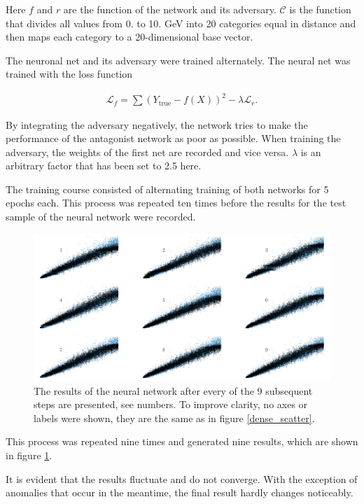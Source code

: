 \documentclass[12pt, a4paper]{thesis}
\begin{document}
Here \(f\) and \(r\) are the function of the network and its
adversary. \(\mathcal{C}\) is the function that divides all values
from 0. to 10. GeV into 20 categories equal in distance and then maps
each category to a 20-dimensional base vector.

The neuronal net and its adversary were trained alternately. The
neural net was trained with the loss function

\begin{align}
\mathcal{L}_f = \sum (Y_{\text{true}} - f(X))^2 - \lambda
\mathcal{L}_r.
\end{align}

By integrating the adversary negatively, the network tries to make the
performance of the antagonist network as poor as possible. When
training the adversary, the weights of the first net are recorded and
vice versa. \(\lambda\) is an arbitrary factor that has been set to 2.5
here. 

The training course consisted of alternating training of both networks
for 5 epochs each. This process was repeated ten times before the
results for the test sample of the neural network were recorded.

\begin{figure}[H]
\centering
\includegraphics[width=.9\linewidth]{../images/adv_scatter.png}
\caption{ The results of the neural network after every of the 9
  subsequent steps are presented, see numbers. To improve clarity, no
  axes or labels were shown, they are the same as in figure
  \ref{dense_scatter}.}
\label{adv_scatter}
\end{figure}

This process was repeated nine times and generated nine results, which
are shown in figure \ref{adv_scatter}.

It is evident that the results fluctuate and do not converge. With
the exception of anomalies that occur in the meantime, the final
result hardly changes noticeably.
\end{document}
